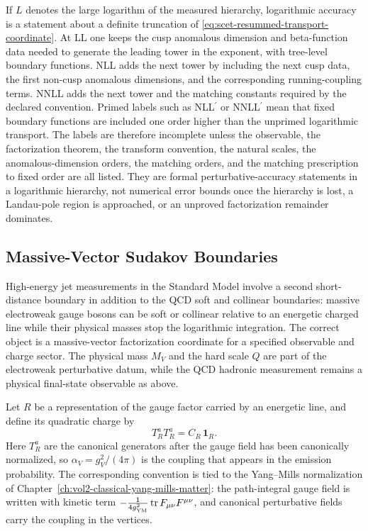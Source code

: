 If \(L\) denotes the large logarithm of the measured hierarchy, logarithmic
accuracy is a statement about a definite truncation of
\eqref{eq:scet-resummed-transport-coordinate}.  At LL one keeps the cusp
anomalous dimension and beta-function data needed to generate the leading
tower in the exponent, with tree-level boundary functions.  NLL adds the next
tower by including the next cusp data, the first non-cusp anomalous
dimensions, and the corresponding running-coupling terms.  NNLL adds the next
tower and the matching constants required by the declared convention.
Primed labels such as NLL\(^{\prime}\) or NNLL\(^{\prime}\) mean that fixed
boundary functions are included one order higher than the unprimed logarithmic
transport.  The labels are therefore incomplete unless the observable, the
factorization theorem, the transform convention, the natural scales, the
anomalous-dimension orders, the matching orders, and the matching prescription
to fixed order are all listed.  They are formal perturbative-accuracy
statements in a logarithmic hierarchy, not numerical error bounds once the
hierarchy is lost, a Landau-pole region is approached, or an unproved
factorization remainder dominates.

\subsection{Massive-Vector Sudakov Boundaries}

High-energy jet measurements in the Standard Model involve a second
short-distance boundary in addition to the QCD soft and collinear boundaries:
massive electroweak gauge bosons can be soft or collinear relative to an
energetic charged line while their physical masses stop the logarithmic
integration.  The correct object is a massive-vector factorization coordinate
for a specified observable and charge sector.  The physical mass \(M_V\) and
the hard scale \(Q\) are part of the electroweak perturbative datum, while
the QCD hadronic measurement remains a physical final-state observable as
above.

Let \(R\) be a representation of the gauge factor carried by an energetic
line, and define its quadratic charge by
\[
  T_R^aT_R^a=C_R\,\mathbf 1_R .
\]
Here \(T_R^a\) are the canonical generators after the gauge field has been
canonically normalized, so \(\alpha_V=g_V^2/(4\pi)\) is the coupling that
appears in the emission probability.  The corresponding convention is tied to
the Yang--Mills normalization of
Chapter~\ref{ch:vol2-classical-yang-mills-matter}: the path-integral gauge
field is written with kinetic term
\(-\frac1{4g_{\rm YM}^2}\operatorname{tr}F_{\mu\nu}F^{\mu\nu}\), and
canonical perturbative fields carry the coupling in the vertices.

